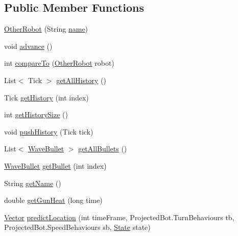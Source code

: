 \subsection*{Public Member Functions}
\begin{DoxyCompactItemize}
\item 
\hyperlink{classmega_1_1boirlerplate_1_1_other_robot_a7fd120d31a5e16fd77e29a26d9473051}{Other\+Robot} (String \hyperlink{classmega_1_1boirlerplate_1_1_other_robot_ac6f8d81032357e6a08992ddb2dc84cb4}{name})
\item 
void \hyperlink{classmega_1_1boirlerplate_1_1_other_robot_a9307f6dac109b513c76c8dc6b64837ba}{advance} ()
\item 
int \hyperlink{classmega_1_1boirlerplate_1_1_other_robot_a8cdfdab759605fde60c407fb831e00ef}{compare\+To} (\hyperlink{classmega_1_1boirlerplate_1_1_other_robot}{Other\+Robot} robot)
\item 
List$<$ Tick $>$ \hyperlink{classmega_1_1boirlerplate_1_1_other_robot_a583b11b6b1dfa1286f708aaa29db105b}{get\+All\+History} ()
\item 
Tick \hyperlink{classmega_1_1boirlerplate_1_1_other_robot_ab1926ef85af1666797e0236ef9a9ca71}{get\+History} (int index)
\item 
int \hyperlink{classmega_1_1boirlerplate_1_1_other_robot_a68bd829755128ad948aae09221c9e9b0}{get\+History\+Size} ()
\item 
void \hyperlink{classmega_1_1boirlerplate_1_1_other_robot_afb0b9c0e155efff23815e16901a5f310}{push\+History} (Tick tick)
\item 
List$<$ \hyperlink{classmega_1_1boirlerplate_1_1_wave_bullet}{Wave\+Bullet} $>$ \hyperlink{classmega_1_1boirlerplate_1_1_other_robot_a81838897cfc98e26f34a63d6fe857878}{get\+All\+Bullets} ()
\item 
\hyperlink{classmega_1_1boirlerplate_1_1_wave_bullet}{Wave\+Bullet} \hyperlink{classmega_1_1boirlerplate_1_1_other_robot_ae6bc50add089f4020e8e21cc771a5d53}{get\+Bullet} (int index)
\item 
String \hyperlink{classmega_1_1boirlerplate_1_1_other_robot_af03b8dad14cd72302d3d3edfb6d0fce6}{get\+Name} ()
\item 
double \hyperlink{classmega_1_1boirlerplate_1_1_other_robot_aaee402de2957910ecb3cdb73261b1178}{get\+Gun\+Heat} (long time)
\item 
\hyperlink{classmega_1_1boirlerplate_1_1_vector}{Vector} \hyperlink{classmega_1_1boirlerplate_1_1_other_robot_ae9390960c468e04c84be7d0e09b90b59}{predict\+Location} (int time\+Frame, Projected\+Bot.\+Turn\+Behaviours tb, Projected\+Bot.\+Speed\+Behaviours sb, \hyperlink{classmega_1_1boirlerplate_1_1_state}{State} state)

\end{DoxyCompactItemize}
